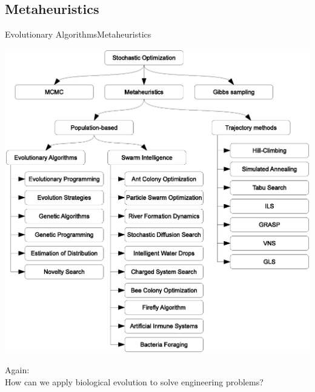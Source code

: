 \documentclass[10pt,compress]{beamer} %
\begin{document}
\subsection{Metaheuristics}
\begin{frame}[plain]{Evolutionary Algorithms}{Metaheuristics}
	\begin{center}
		\includegraphics[width=0.75\linewidth]{figs/metaheuristics.eps}
	\end{center}
\end{frame}

\begin{frame}[plain]{}
	\vspace{2cm}
	\begin{center}
	Again:\\
	How can we apply biological evolution to solve engineering problems?
	\end{center}
\end{frame}
\end{document}
